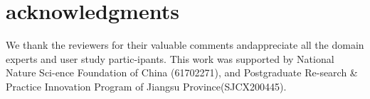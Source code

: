 \section{acknowledgments}
We thank the reviewers for their valuable comments andappreciate all the domain experts and user study partic-ipants. This work was supported by National Nature Sci-ence Foundation of China (61702271), and Postgraduate Re-search \& Practice Innovation Program of Jiangsu Province(SJCX200445).